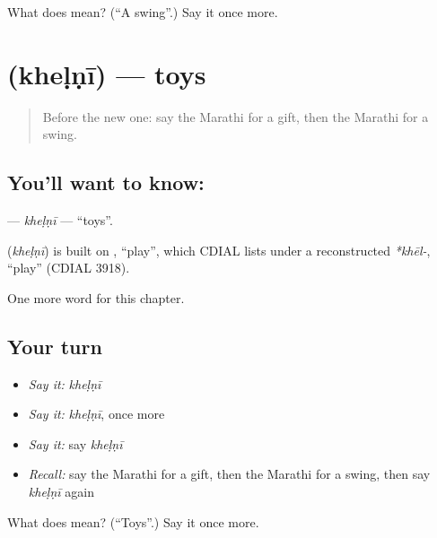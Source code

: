 \begin{tcolorbox}[breakable,colback=teal!4,colframe=teal!35!black,title={Before you move on}]
What does  mean? (\textquotedblleft{}A swing\textquotedblright{}.) Say it once more.
\end{tcolorbox}
\section[\texorpdfstring{\mr{खेळणी} (kheḷṇī)}{खेळणी (kheḷṇī)}]{ (kheḷṇī) — toys}

\label{lesson:MR-C249-khelni}



\begin{quote}
Before the new one: say the Marathi for a gift, then the Marathi for a swing.
\end{quote}

\subsection*{You'll want to know: }
\textbf{} — \emph{kheḷṇī} — \textquotedblleft{}toys\textquotedblright{}.

\begin{cousinweb}
\textbf{} (\emph{kheḷṇī}) is built on \textbf{}, \textquotedblleft{}play\textquotedblright{}, which CDIAL lists under a reconstructed \emph{*khēl-}, \textquotedblleft{}play\textquotedblright{} (CDIAL 3918).
\end{cousinweb}

\begin{grammarlens}[title={What you've built}]
One more word for this chapter.
\end{grammarlens}

\subsection*{Your turn}
\begin{itemize}
\raggedright
  \item \emph{Say it:} \emph{kheḷṇī}
  \item \emph{Say it:} \emph{kheḷṇī}, once more
  \item \emph{Say it:} say \emph{kheḷṇī}
  \item \emph{Recall:} say the Marathi for a gift, then the Marathi for a swing, then say \emph{kheḷṇī} again
\end{itemize}

\begin{tcolorbox}[breakable,colback=teal!4,colframe=teal!35!black,title={Before you move on}]
What does  mean? (\textquotedblleft{}Toys\textquotedblright{}.) Say it once more.
\end{tcolorbox}

